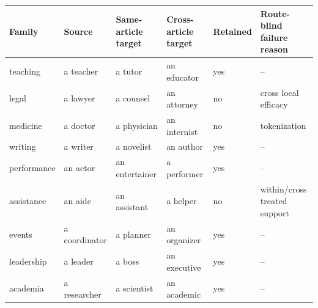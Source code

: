 \documentclass[
]{article}
\newcounter{none} %
\begin{document}
{\def\LTcaptype{none} %
\begin{longtable}[]{@{}
  >{\raggedright\arraybackslash}p{}
  >{\raggedright\arraybackslash}p{}
  >{\raggedright\arraybackslash}p{}
  >{\raggedright\arraybackslash}p{}
  >{\centering\arraybackslash}p{}
  >{\raggedright\arraybackslash}p{}@{}}
\toprule\noalign{}
\begin{minipage}[b]{\linewidth}\raggedright
Family
\end{minipage} & \begin{minipage}[b]{\linewidth}\raggedright
Source
\end{minipage} & \begin{minipage}[b]{\linewidth}\raggedright
Same-article target
\end{minipage} & \begin{minipage}[b]{\linewidth}\raggedright
Cross-article target
\end{minipage} & \begin{minipage}[b]{\linewidth}\centering
Retained
\end{minipage} & \begin{minipage}[b]{\linewidth}\raggedright
Route-blind failure reason
\end{minipage} \\
\midrule\noalign{}
\endhead
\bottomrule\noalign{}
\endlastfoot
teaching & a teacher & a tutor & an educator & yes & -- \\
legal & a lawyer & a counsel & an attorney & no & cross local
efficacy \\
medicine & a doctor & a physician & an internist & no & tokenization \\
writing & a writer & a novelist & an author & yes & -- \\
performance & an actor & an entertainer & a performer & yes & -- \\
assistance & an aide & an assistant & a helper & no & within/cross
treated support \\
events & a coordinator & a planner & an organizer & yes & -- \\
leadership & a leader & a boss & an executive & yes & -- \\
academia & a researcher & a scientist & an academic & yes & -- \\

\end{longtable}}
\end{document}
